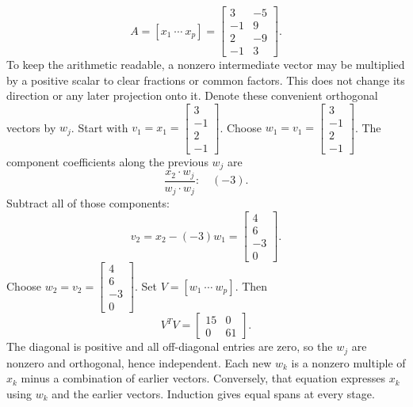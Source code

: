 \[A=[x_1\ \cdots\ x_p]=\left[\begin{array}{rr}3&-5\\-1&9\\2&-9\\-1&3\end{array}\right].\]
To keep the arithmetic readable, a nonzero intermediate vector may be multiplied by a positive scalar to clear fractions or common factors. This does not change its direction or any later projection onto it. Denote these convenient orthogonal vectors by $w_j$.
Start with $v_1=x_1=\left[\begin{array}{r}3\\-1\\2\\-1\end{array}\right]$.
Choose $w_{1}=v_{1}=\left[\begin{array}{r}3\\-1\\2\\-1\end{array}\right]$.
The component coefficients along the previous $w_j$ are
\[\frac{x_{2}\cdot w_j}{w_j\cdot w_j}:\quad(-3).\]
Subtract all of those components:
\[v_{2}=x_{2}-(-3)w_{1}=\left[\begin{array}{r}4\\6\\-3\\0\end{array}\right].\]
Choose $w_{2}=v_{2}=\left[\begin{array}{r}4\\6\\-3\\0\end{array}\right]$.
Set $V=[w_1\ \cdots\ w_p]$. Then
\[V^TV=\left[\begin{array}{rr}15&0\\0&61\end{array}\right].\]
The diagonal is positive and all off-diagonal entries are zero, so the $w_j$ are nonzero and orthogonal, hence independent. Each new $w_k$ is a nonzero multiple of $x_k$ minus a combination of earlier vectors. Conversely, that equation expresses $x_k$ using $w_k$ and the earlier vectors. Induction gives equal spans at every stage.

